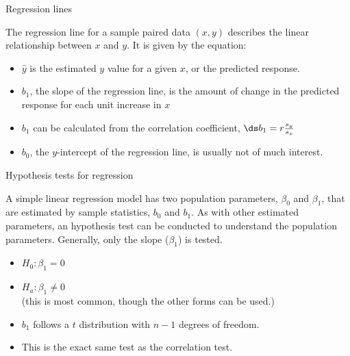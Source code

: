 \documentclass[xcolor=table, aspectratio=169, bigger, handout]{beamer}
\begin{document}
\begin{frame}{Regression lines}
\begin{block}{}
The regression line for a sample paired data $(x,y)$ describes the linear relationship between $x$ and $y$. It is given by the equation:\\
\medskip
{}
\smallskip
\begin{itemize}
\pause\item $\hat y$ is the estimated $y$ value for a given $x$, or the predicted response.
\pause\item $b_1$, the slope of the regression line, is the amount of change in the predicted response for each unit increase in $x$
\pause\item $b_1$ can be calculated from the correlation coefficient, $\ds b_1 = r \frac{s_y}{s_x}$
\pause\item $b_0$, the $y$-intercept of the regression line, is usually not of much interest.
\end{itemize}
\end{block}
\end{frame}

\begin{frame}{Hypothesis tests for regression}

\begin{block}{}
A simple linear regression model has two population parameters, $\beta_0$ and $\beta_1$, that are estimated by sample statistics, $b_0$ and $b_1$. As with other estimated parameters, an hypothesis test can be conducted to understand the population parameters. Generally, only the slope ($\beta_1$) is tested.

\begin{itemize}
\pause\item $H_0: \beta_1 = 0$
\pause\item $H_a: \beta_1 \ne 0$ \\ (this is most common, though the other forms can be used.)
\pause\item $b_1$ follows a $t$ distribution with $n-1$ degrees of freedom.
\pause\item This is the exact same test as the correlation test.
\end{itemize}

\end{block}
\end{frame}
\end{document}

